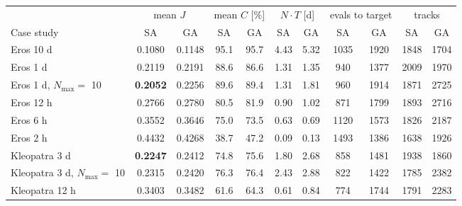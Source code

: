 \begin{tabular}{@{}lcccccccccc@{}}
\toprule
 & \multicolumn{2}{c}{mean $J$} & \multicolumn{2}{c}{mean $C$ [\%]} & \multicolumn{2}{c}{$N\cdot T$ [d]} & \multicolumn{2}{c}{evals to target} & \multicolumn{2}{c}{tracks} \\
\cmidrule(lr){2-3}\cmidrule(lr){4-5}\cmidrule(lr){6-7}\cmidrule(lr){8-9}\cmidrule(lr){10-11}
Case study & SA & GA & SA & GA & SA & GA & SA & GA & SA & GA \\
\midrule
Eros 10 d & 0.1080 & 0.1148 & 95.1 & 95.7 & 4.43 & 5.32 & 1035 & 1920 & 1848 & 1704 \\
Eros 1 d & 0.2119 & 0.2191 & 88.6 & 86.6 & 1.31 & 1.35 & 940 & 1377 & 2009 & 1970 \\
Eros 1 d, $N_{\max}=$ 10 & \textbf{0.2052} & 0.2256 & 89.6 & 89.4 & 1.31 & 1.81 & 960 & 1914 & 1871 & 2725 \\
Eros 12 h & 0.2766 & 0.2780 & 80.5 & 81.9 & 0.90 & 1.02 & 871 & 1799 & 1893 & 2716 \\
Eros 6 h & 0.3552 & 0.3646 & 75.0 & 73.5 & 0.63 & 0.69 & 1120 & 1573 & 1826 & 2187 \\
Eros 2 h & 0.4432 & 0.4268 & 38.7 & 47.2 & 0.09 & 0.13 & 1493 & 1386 & 1638 & 1926 \\
Kleopatra 3 d & \textbf{0.2247} & 0.2412 & 74.8 & 75.6 & 1.80 & 2.68 & 858 & 1481 & 1938 & 1860 \\
Kleopatra 3 d, $N_{\max}=$ 10 & 0.2315 & 0.2420 & 76.3 & 76.4 & 2.43 & 2.88 & 822 & 1422 & 1785 & 2382 \\
Kleopatra 12 h & 0.3403 & 0.3482 & 61.6 & 64.3 & 0.61 & 0.84 & 774 & 1744 & 1791 & 2283 \\
\bottomrule
\end{tabular}

